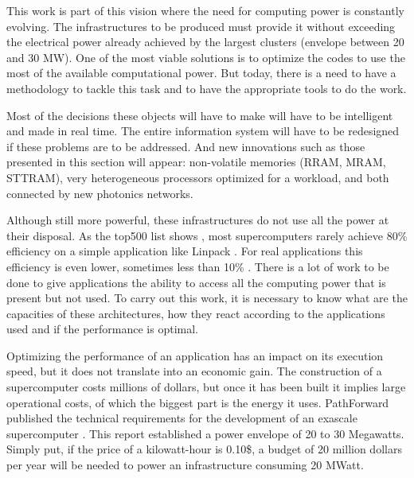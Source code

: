 This work is part of this vision where the need for computing power is constantly evolving. The infrastructures to be produced must provide it without exceeding the electrical power already achieved by the largest clusters (envelope between 20 and 30 MW). One of the most viable solutions is to optimize the codes to use the most of the available computational power. But today, there is a need to have a methodology to tackle this task and to have the appropriate tools to do the work.

Most of the decisions these objects will have to make will have to be intelligent and made in real time. The entire information system will have to be redesigned if these problems are to be addressed. And new innovations such as those presented in this section will appear: non-volatile memories (RRAM, MRAM, STTRAM), very heterogeneous processors optimized for a workload, and both connected by new photonics networks.


Although still more powerful, these infrastructures do not use all the power at their disposal. As the top500 list shows \cite{Top500}, most supercomputers rarely achieve 80\% efficiency on a simple application like Linpack \cite{Dongarra2003}. For real applications this efficiency is even lower, sometimes less than 10\% \cite{Oliker2005}. There is a lot of work to be done to give applications the ability to access all the computing power that is present but not used. To carry out this work, it is necessary to know what are the capacities of these architectures, how they react according to the applications used and if the performance is optimal.


Optimizing the performance of an application has an impact on its execution speed, but it  does not translate into an economic gain. The construction of a supercomputer costs millions of dollars, but once it has been built it implies large operational costs, of which the biggest part is the energy it uses. PathForward published the technical requirements for the development of an exascale supercomputer \cite{Ang2016}. This report established a power envelope of 20 to 30 Megawatts. Simply put, if the price of a kilowatt-hour is 0.10\$, a budget of 20 million dollars per year will be needed to power an infrastructure consuming 20 MWatt.